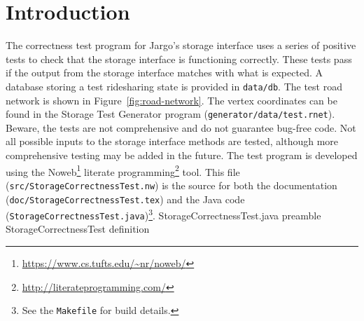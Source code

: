 \documentclass{article}
\def\nwendcode{\endtrivlist \endgroup}
\let\nwdocspar=\par
\begin{document}
\section{Introduction}
\label{sec:introduction}
The correctness test program for Jargo's storage interface uses a series of
positive tests to check that the storage interface is functioning correctly.
These tests pass if the output from the storage interface matches with what is
expected. A database storing a test ridesharing state is provided in
{\tt{}data/db}.  The test road network is shown in Figure~\ref{fig:road-network}.
The vertex coordinates can be found in the Storage Test Generator program
({\tt{}generator/data/test.rnet}).  Beware, the tests are not comprehensive and do
not guarantee bug-free code. Not all possible inputs to the storage interface
methods are tested, although more comprehensive testing may be added in the
future.  The test program is developed using the
Noweb\footnote{\url{https://www.cs.tufts.edu/~nr/noweb/}} literate
programming\footnote{\url{http://literateprogramming.com/}} tool.  This file
({\tt{}src/StorageCorrectnessTest.nw}) is the source for both the documentation
({\tt{}doc/StorageCorrectnessTest.tex}) and the Java code
({\tt{}StorageCorrectnessTest.java})\footnote{See the {\tt{}Makefile} for build
details.}.
\endmoddef{}
\LA{}StorageCorrectnessTest.java preamble~{\nwtagstyle{}}\RA{}
\LA{}\code{}StorageCorrectnessTest\edoc{} definition~{\nwtagstyle{}}\RA{}
\nwendcode{}\nwdocspar
\end{document}
